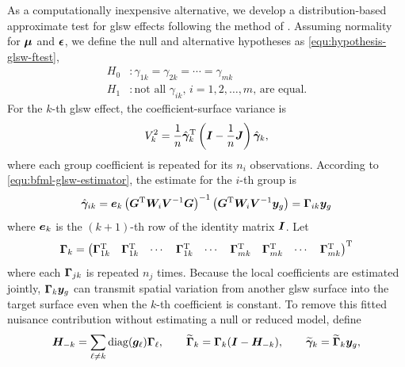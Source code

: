 \documentclass[times]{interact}
\theoremstyle{plain}%
\theoremstyle{definition}
\theoremstyle{remark}
\begin{document}
As a computationally inexpensive alternative, we develop a distribution-based approximate test for \gls{glsw} effects following the method of \citet{LeungMei-2000}.
Assuming normality for $\bm{\mu}$ and $\bm{\epsilon}$,
we define the null and alternative hypotheses as \autoref{equ:hypothesis-glsw-ftest},
\begin{equation}\label{equ:hypothesis-glsw-ftest}
    \begin{split}
        H_{0} & : \gamma_{1k} = \gamma_{2k} = \cdots = \gamma_{mk}  \\
        H_{1} & : \mbox{not all $\gamma_{ik}$, $i=1,2,\ldots,m$, are equal.}
    \end{split}
\end{equation}
For the $k$-th \gls{glsw} effect, the coefficient-surface variance is
\begin{equation}\label{equ:glsw-ftest-variance}
  V_{k}^2
  = \frac{1}{n}\hat{\bm{\gamma}}_{k}^{\mathrm{T}}
  \left(\bm{I}-\frac{1}{n}\bm{J}\right)
  \hat{\bm{\gamma}}_{k},
\end{equation}
where each group coefficient is repeated for its $n_i$ observations.
According to \autoref{equ:bfml-glsw-estimator}, the estimate for the $i$-th group is
\begin{equation*}
    \hat{\bm{\gamma}}_{ik} = \bm{e}_{k} \left( \bm{G}^{\mathrm{T}}\bm{W}_{i}\bm{V}^{-1}\bm{G} \right)^{-1}\left( \bm{G}^{\mathrm{T}}\bm{W}_{i}\bm{V}^{-1}\bm{y}_{g} \right) = \bm{\Gamma}_{ik}\bm{y}_{g}
\end{equation*}
where $\bm{e}_k$ is the $(k+1)$-th row of the identity matrix $\bm{I}$.
Let
\begin{equation}\label{equ:ftest-glsw-Gamma-full}
\bm{\Gamma}_k = \begin{pmatrix}
\bm{\Gamma}_{1k}^\mathrm{T} & \bm{\Gamma}_{1k}^\mathrm{T} & \cdots & \bm{\Gamma}_{1k}^\mathrm{T} & \cdots &
\bm{\Gamma}_{mk}^\mathrm{T} & \bm{\Gamma}_{mk}^\mathrm{T} & \cdots &
\bm{\Gamma}_{mk}^\mathrm{T}
\end{pmatrix}^\mathrm{T}
\end{equation}
where each $\bm{\Gamma}_{jk}$ is repeated $n_j$ times.
Because the local coefficients are estimated jointly, $\bm{\Gamma}_k\bm{y}_g$ can transmit spatial variation from another \gls{glsw} surface into the target surface even when the $k$-th coefficient is constant.
To remove this fitted nuisance contribution without estimating a null or reduced model, define
\begin{equation}\label{equ:glsw-ftest-adjusted-map}
  \bm{H}_{-k}=\sum_{\ell\ne k}\operatorname{diag}(\bm{g}_{\ell})\bm{\Gamma}_{\ell},
  \qquad
  \widetilde{\bm{\Gamma}}_{k}=\bm{\Gamma}_k(\bm{I}-\bm{H}_{-k}),
  \qquad
  \widetilde{\bm{\gamma}}_{k}=\widetilde{\bm{\Gamma}}_{k}\bm{y}_g,
\end{equation}
\end{document}
